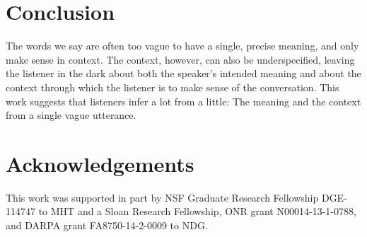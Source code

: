 \documentclass[doc]{apa6}
\begin{document}
%
%
%


\section{Conclusion}

The words we say are often too vague to have a single, precise meaning,
and only make sense in context. The context, however, can also be
underspecified, leaving the listener in the dark about both the
speaker's intended meaning and about the context through which the
listener is to make sense of the conversation. This work suggests that listeners infer a lot from a little:
The meaning and the context from a single vague utterance.


\section{Acknowledgements}

This work was supported in part by NSF Graduate Research Fellowship
DGE-114747 to MHT and a
Sloan Research Fellowship, ONR grant N00014-13-1-0788, and DARPA grant
FA8750-14-2-0009 to NDG.
\end{document}

